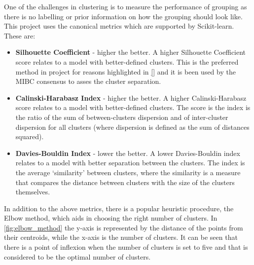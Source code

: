 One of the challenges in clustering is to measure the performance of grouping as there is no labelling or prior information on how the grouping should look like. This project uses the canonical metrics which are supported by Scikit-learn\cite{Pedregosa2011-ts,Scikit-learn_undated-ax}. These are:
\begin{itemize}
  \item \textbf{Silhouette Coefficient} - higher the better. A higher Silhouette Coefficient score relates to a model with better-defined clusters. This is the preferred method in project for reasons highlighted in \ref{} and it is been used by the MIBC consensus \citet{Kamoun2020-tj} to asses the cluster separation.
  \item \textbf{Calinski-Harabasz Index} - higher the better. A higher Calinski-Harabasz score relates to a model with better-defined clusters.  The score is the index is the ratio of the sum of between-clusters dispersion and of inter-cluster dispersion for all clusters (where dispersion is defined as the sum of distances squared).
  \item \textbf{Davies-Bouldin Index} - lower the better. A lower Davies-Bouldin index relates to a model with better separation between the clusters. The index is the average ‘similarity’ between clusters, where the similarity is a measure that compares the distance between clusters with the size of the clusters themselves.
\end{itemize}


In addition to the above metrics, there is a popular heuristic procedure, the Elbow method, which aids in choosing the right number of clusters. In \cref{fig:elbow_method} the y-axis is represented by the distance of the points from their centroids, while the x-axis is the number of clusters. It can be seen that there is a point of inflexion when the number of clusters is set to five and that is considered to be the optimal number of clusters.

